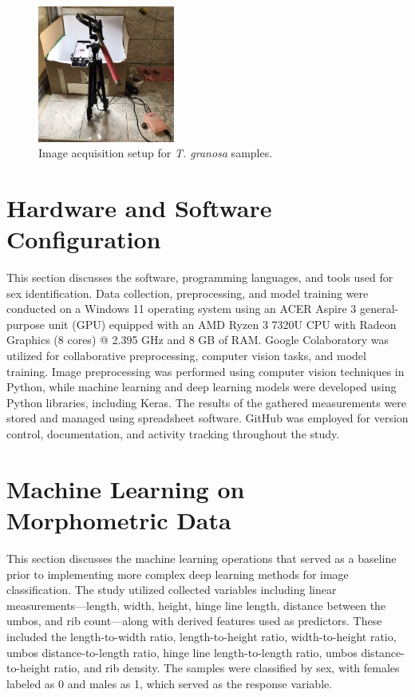 \begin{figure}[!htbp]
	\centering
	\includegraphics[width=0.4\textwidth]{figures/setup.jpg}
	\caption{Image acquisition setup for \textit{T. granosa} samples.}
	\label{fig:setup}
\end{figure}

\newpage
\section{Hardware and Software Configuration}

This section discusses the software, programming languages, and tools used for sex identification. Data collection, preprocessing, and model training were conducted on a Windows 11 operating system using an ACER Aspire 3 general-purpose unit (GPU) equipped with an AMD Ryzen 3 7320U CPU with Radeon Graphics (8 cores) @ 2.395 GHz and 8 GB of RAM. Google Colaboratory was utilized for collaborative preprocessing, computer vision tasks, and model training. Image preprocessing was performed using computer vision techniques in Python, while machine learning and deep learning models were developed using Python libraries, including Keras. The results of the gathered measurements were stored and managed using spreadsheet software. GitHub was employed for version control, documentation, and activity tracking throughout the study.

\section{Machine Learning on Morphometric Data}
\label{sec:ml models}

This section discusses the machine learning operations that served as a baseline prior to implementing more complex deep learning methods for image classification. The study utilized collected variables including linear measurements—length, width, height, hinge line length, distance between the umbos, and rib count—along with derived features used as predictors. These included the length-to-width ratio, length-to-height ratio, width-to-height ratio, umbos distance-to-length ratio, hinge line length-to-length ratio, umbos distance-to-height ratio, and rib density. The samples were classified by sex, with females labeled as 0 and males as 1, which served as the response variable.

